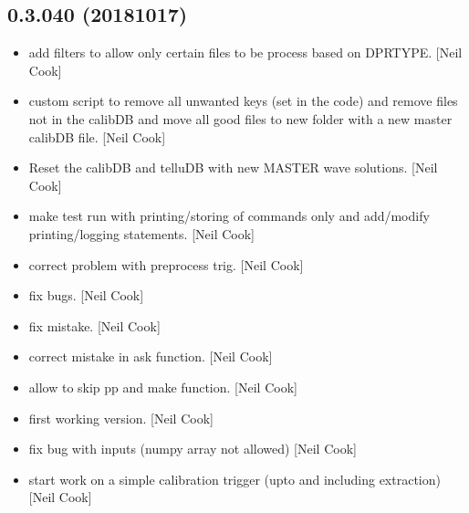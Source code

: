 \documentclass[a4paper,10pt,english]{report}
\begin{document}
\subsection{0.3.040 (2018\sphinxhyphen{}10\sphinxhyphen{}17)}
\label{\detokenize{misc/changelog:id309}}\begin{itemize}
\item {} 
 \sphinxhyphen{} add filters to allow only certain files to be
process based on DPRTYPE. {[}Neil Cook{]}

\item {} 
 \sphinxhyphen{} custom script to remove all unwanted keys (set in the
code) and remove files not in the calibDB and move all good files to
new folder with a new master calibDB file. {[}Neil Cook{]}

\item {} 
Reset the calibDB and telluDB with new MASTER wave solutions. {[}Neil
Cook{]}

\item {} 
 \sphinxhyphen{} make test run \sphinxhyphen{} with printing/storing of commands
only and add/modify printing/logging statements. {[}Neil Cook{]}

\item {} 
 \sphinxhyphen{} correct problem with preprocess trig. {[}Neil Cook{]}

\item {} 
 \sphinxhyphen{} fix bugs. {[}Neil Cook{]}

\item {} 
 \sphinxhyphen{} fix mistake. {[}Neil Cook{]}

\item {} 
 \sphinxhyphen{} correct mistake in ask function. {[}Neil Cook{]}

\item {} 
 \sphinxhyphen{} allow to skip pp and make function. {[}Neil Cook{]}

\item {} 
 \sphinxhyphen{} first working version. {[}Neil Cook{]}

\item {} 
 \sphinxhyphen{} fix bug with inputs (numpy array not allowed) {[}Neil
Cook{]}

\item {} 
 \sphinxhyphen{} start work on a simple calibration trigger (upto
and including extraction) {[}Neil Cook{]}

\end{itemize}
\end{document}
